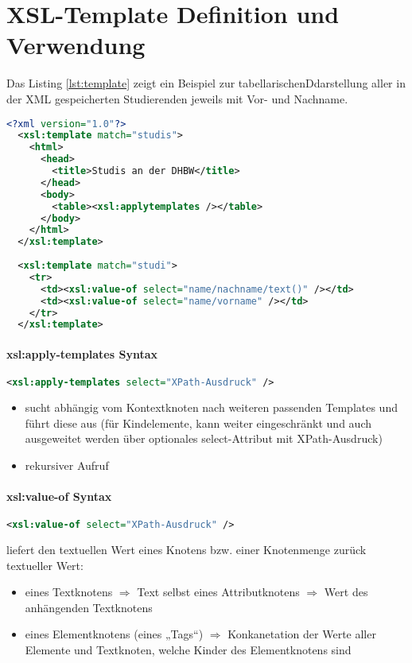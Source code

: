 \section{XSL-Template Definition und Verwendung}
Das Listing \vref{lst:template} zeigt ein Beispiel zur tabellarischenDdarstellung aller in der XML gespeicherten Studierenden jeweils mit Vor- und Nachname.
\begin{lstlisting}[caption={Praktisches Beispiel für xsl:template}, label={lst:template}, language={XML}]
  <?xml version="1.0"?>
  <xsl:template match="studis">
    <html>
      <head>
        <title>Studis an der DHBW</title>
      </head>
      <body>
        <table><xsl:applytemplates /></table>
      </body>
    </html>
  </xsl:template>
  
  <xsl:template match="studi">
    <tr>
      <td><xsl:value-of select="name/nachname/text()" /></td>
      <td><xsl:value-of select="name/vorname" /></td>
    </tr>
  </xsl:template>
\end{lstlisting}

\paragraph{xsl:apply-templates Syntax}\hspace{1mm}
\begin{lstlisting}[caption={xsl:apply-templates Syntax}, label={lst:xsl:apply-templates}, language={XML}]
  <xsl:apply-templates select="XPath-Ausdruck" />
\end{lstlisting}
\begin{itemize}
\item sucht abhängig vom Kontextknoten nach weiteren passenden Templates und führt diese aus (für Kindelemente, kann weiter eingeschränkt und auch ausgeweitet werden über optionales select-Attribut mit XPath-Ausdruck)
\item rekursiver Aufruf
\end{itemize}

\paragraph{xsl:value-of Syntax}\hspace{1mm}
\begin{lstlisting}[caption={xsl:value-of Syntax}, label={lst:value-of}, language={XML}]
  <xsl:value-of select="XPath-Ausdruck" />
\end{lstlisting}
liefert den textuellen Wert eines Knotens bzw. einer Knotenmenge zurück
textueller Wert:
\begin{itemize}
\item eines Textknotens $\Rightarrow$ Text selbst eines Attributknotens $\Rightarrow$ Wert des anhängenden Textknotens
\item eines Elementknotens (eines „Tags“) $\Rightarrow$ Konkanetation der Werte aller Elemente und Textknoten, welche Kinder des Elementknotens sind
\end{itemize}

